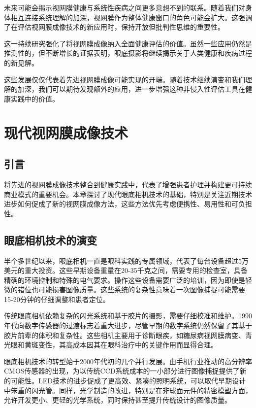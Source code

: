 \documentclass[
  Letterpaper,
]{scrbook}
\begin{document}
未来可能会揭示视网膜健康与系统性疾病之间更多意想不到的联系。随着我们对身体相互连接系统理解的加深，视网膜作为整体健康窗口的角色可能会扩大。这强调了在评估视网膜成像技术的新应用时，保持开放但批判性思维的重要性。

这一持续研究强化了将视网膜成像纳入全面健康评估的价值。虽然一些应用仍然是推测性的，但不断增长的证据表明，眼底摄影将继续揭示关于人类健康和疾病过程的新见解。

这些发展仅仅代表着先进视网膜成像可能实现的开端。随着技术继续演变和我们理解的加深，我们可以期待发现额外的应用，进一步增强这种非侵入性评估工具在健康实践中的价值。


\chapter{现代视网膜成像技术}\label{ux73b0ux4ee3ux89c6ux7f51ux819cux6210ux50cfux6280ux672f}

\section{引言}\label{ux5f15ux8a00}

将先进的视网膜成像技术整合到健康实践中，代表了增强患者护理并构建更可持续商业模式的重要机会。本章探讨了现代眼底相机技术的基础，特别是关注近期技术进步如何促成了新的视网膜成像方法，这些方法优先考虑便携性、易用性和可负担性。

\section{眼底相机技术的演变}\label{ux773cux5e95ux76f8ux673aux6280ux672fux7684ux6f14ux53d8}

半个多世纪以来，眼底相机一直是眼科实践的专属领域，代表了每台设备超过5万美元的重大投资。这些早期设备重量在20-35千克之间，需要专用的检查室，具备精确的环境控制和特殊的电气要求。操作这些设备需要广泛的培训，因为即使是轻微的错位也可能损害图像质量。这些系统的复杂性意味着一次图像捕捉可能需要15-20分钟的仔细调整和患者定位。

传统眼底相机依赖复杂的闪光系统和基于胶片的摄影，需要仔细校准和维护。1990年代向数字传感器的过渡标志着重大进步，尽管早期的数字系统仍然保留了其基于胶片前辈的体积和复杂性。这些相机主要用于诊断眼疾，如糖尿病视网膜病变、青光眼和黄斑变性，其高成本因其在眼科治疗中的关键作用而显得合理。

眼底相机技术的转型始于2000年代初的几个并行发展。由手机行业推动的高分辨率CMOS传感器的出现，为以传统CCD系统成本的一小部分进行图像捕捉提供了新的可能性。LED技术的进步促成了更高效、紧凑的照明系统，可以取代早期设计中笨重的闪光管。同样，光学制造的改进，特别是在非球面元件的精密模塑方面，允许开发更小、更轻的光学系统，同时保持甚至提升传统设计的图像质量。
\end{document}
